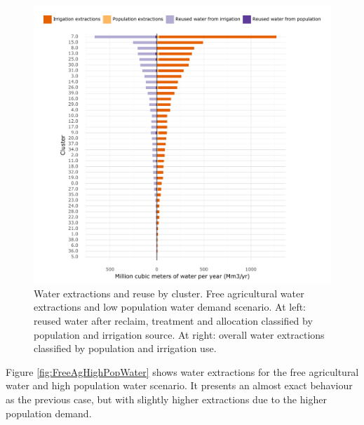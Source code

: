 \documentclass[12pt]{iopart}
\begin{document}
\begin{figure}[!h]
	\centering
	\includegraphics[width=\textwidth]{Free_agri_water_Low_pop_water}
	\caption{Water extractions and reuse by cluster. Free agricultural water extractions and low population water demand scenario. At left: reused water after reclaim, treatment and allocation classified by population and irrigation source. At right: overall water extractions classified by population and irrigation use.}
	\label{fig:FreeAgLowPopWater}
\end{figure}
\newpage

Figure \autoref{fig:FreeAgHighPopWater} shows water extractions for the free agricultural water and high population water scenario. It presents an almost exact behaviour as the previous case, but with slightly higher extractions due to the higher population demand.
\end{document}
